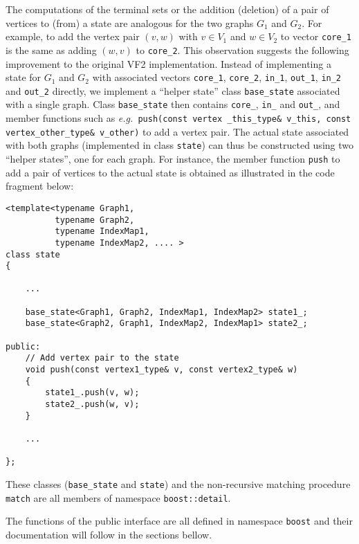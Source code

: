 \documentclass[12pt]{article}
\def\eg{{\it e.g.\ }}
\begin{document}
The computations of the terminal sets or the addition (deletion) of a pair of
vertices to (from) a state are analogous for the two graphs $G_1$ and $G_2$.
For example, to add the vertex pair $(v, w)$ with $v \in V_1$ and $w \in V_2$
to vector \verb+core_1+ is the same as adding $(w, v)$ to \verb+core_2+.  This
observation suggests the following improvement to the original {\sc VF2}
implementation.  Instead of implementing a state for $G_1$ and $G_2$ with
associated vectors \verb+core_1+, \verb+core_2+, \verb+in_1+, \verb+out_1+,
\verb+in_2+ and \verb+out_2+ directly, we implement a ``helper state'' class
\verb+base_state+ associated with a single graph. Class \verb+base_state+ then
contains \verb+core_+, \verb+in_+ and \verb+out_+, and member functions such as
\eg \texttt{push(const vertex \_this\_type\& v\_this, const vertex\_other\_type\& v\_other)} 
to add a vertex pair. The actual state associated with both graphs (implemented in
class \verb+state+) can thus be constructed using two ``helper states'', one
for each graph. For instance, the member function \verb+push+ to add a pair of
vertices to the actual state is obtained as illustrated in the code
fragment below:

\lstset{breaklines=true, breakatwhitespace=true}
\lstset{columns=fullflexible}
\lstset{language=C++}
\begin{lstlisting}
<template<typename Graph1,
          typename Graph2,
          typename IndexMap1,
          typename IndexMap2, .... >
class state
{

    ...

    base_state<Graph1, Graph2, IndexMap1, IndexMap2> state1_;
    base_state<Graph2, Graph1, IndexMap2, IndexMap1> state2_;

public:
    // Add vertex pair to the state
    void push(const vertex1_type& v, const vertex2_type& w)
    {
        state1_.push(v, w);
        state2_.push(w, v);
    }

    ...

};
\end{lstlisting}

These classes (\verb+base_state+ and \verb+state+) and the non-recursive
matching procedure \verb+match+ are all members of namespace \verb+boost::detail+.

The functions of the public interface are all defined in namespace \verb+boost+ and their
documentation will follow in the sections bellow.
\end{document}

